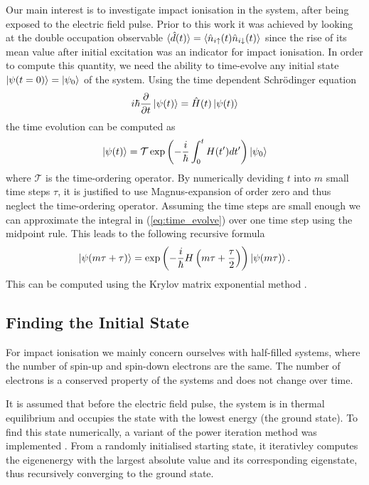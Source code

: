 Our main interest is to investigate impact ionisation in the system, after being exposed to the electric field pulse. Prior to this work it was achieved by looking at the double occupation observable $\braket{\hat{d}(t)} = \braket{\hat{n}_{i\uparrow}(t) \hat{n}_{i\downarrow}(t)}$ since the rise of its mean value after initial excitation was an indicator for impact ionisation. In order to compute this quantity, we need the ability to time-evolve any initial state $\ket{\psi(t=0)} = \ket{\psi_0}$ of the system. Using the time dependent Schrödinger equation
\begin{equation}
    i\hbar \frac{\partial}{\partial t}\ket{\psi(t)} = \hat{H}(t)\ket{\psi(t)}\label{eq:time_evolve}
\end{equation}
the time evolution can be computed as
\begin{equation}
    \ket{\psi (t)} = \mathcal{T} \exp\left(-\frac{i}{\hbar}\int_0^t H(t') dt'\right) \ket{\psi_0}
\end{equation}
where $\mathcal{T}$ is the time-ordering operator. By numerically deviding $t$ into $m$ small time steps $\tau$, it is justified to use Magnus-expansion \cite{magnus} of order zero and thus neglect the time-ordering operator. Assuming the time steps are small enough we can approximate the integral in (\ref{eq:time_evolve}) over one time step using the midpoint rule. This leads to the following recursive formula
\begin{equation}
    \ket{\psi(m\tau + \tau)} = \exp\left(-\frac{i}{\hbar} H\left(m\tau + \frac{\tau}{2}\right)\right)\ket{\psi(m\tau)}.
\end{equation}
This can be computed using the Krylov matrix exponential method \cite{innerberger}.


\subsection{Finding the Initial State}
For impact ionisation we mainly concern ourselves with half-filled systems, where the number of spin-up and spin-down electrons are the same. The number of electrons is a conserved property of the systems and does not change over time.
\medskip

It is assumed that before the electric field pulse, the system is in thermal equilibrium and occupies the state with the lowest energy (the ground state). To find this state numerically, a variant of the power iteration method was implemented \cite{innerberger}. From a randomly initialised starting state, it iterativley computes the eigenenergy with the largest absolute value and its corresponding eigenstate, thus recursively converging to the ground state.


